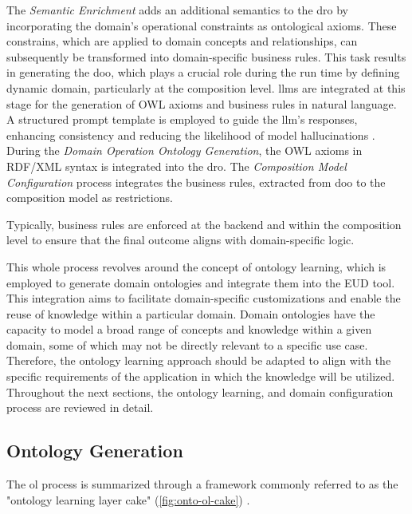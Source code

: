 The \emph{Semantic Enrichment} adds an additional semantics to the \gls{dro}
by incorporating the domain's operational constraints as ontological
axioms. These constrains, which are applied to domain concepts and
relationships, can subsequently be transformed into domain-specific
business rules. This task results in generating the \gls{doo}, which plays a
crucial role during the run time by defining dynamic domain,
particularly at the composition level. \gls{llm}s are integrated at this stage
for the generation of OWL axioms and business rules in natural language.
A structured prompt template is employed to guide the
\gls{llm}'s responses, enhancing consistency and reducing the
likelihood of model hallucinations \autocite{Perera2024}.
During the \emph{Domain Operation Ontology Generation}, the OWL axioms
in RDF/XML syntax is integrated into the \gls{dro}. The \emph{Composition
Model Configuration} process integrates the business rules, extracted
from \gls{doo} to the composition model as restrictions.

Typically, business rules are enforced at the backend and within the
composition level to ensure that the final outcome aligns with
domain-specific logic.

This whole process revolves around the concept of ontology learning,
which is employed to generate domain ontologies and integrate them into
the EUD tool. This integration aims to facilitate domain-specific
customizations and enable the reuse of knowledge within a particular
domain. Domain ontologies have the capacity to model a broad range of
concepts and knowledge within a given domain, some of which may not be
directly relevant to a specific use case. Therefore, the ontology
learning approach should be adapted to align with the specific
requirements of the application in which the knowledge will be utilized.
Throughout the next sections, the ontology learning, and domain
configuration process are reviewed in detail.

\vspace{-10pt}
\hypertarget{sec:ontology-gen}{%
\subsection{Ontology Generation}\label{sec:ontology-gen}}
\vspace{10pt} 	
The \gls{ol} process is summarized through a framework commonly referred to as the "ontology learning layer cake" (\cref{fig:onto-ol-cake}) \autocite{Asim2018}.

